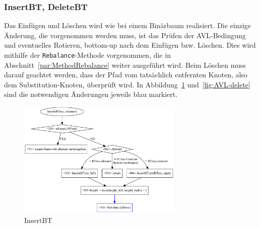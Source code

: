 \subsubsection{InsertBT, DeleteBT}
Das Einfügen und Löschen wird wie bei einem Binärbaum realisiert.
Die einzige Änderung, die vorgenommen werden muss, ist das Prüfen der
AVL-Bedingung und eventuelles Rotieren, bottom-up nach dem Einfügen bzw. Löschen.
Dies wird mithilfe der \verb|Rebalance|-Methode vorgenommen, die in
Abschnitt~\ref{par:MethodRebalance} weiter ausgeführt wird.
Beim Löschen muss darauf geachtet werden, dass der Pfad vom tatsächlich entfernten Knoten, also
dem Substitution-Knoten, überprüft wird.
In Abbildung~\ref{fig:AVL-insert} und~\ref{fig:AVL-delete} sind die notwendigen Änderungen jeweils
blau markiert.

\begin{figure}[htbp]
    \centering
    \includegraphics[width= 0.70\textwidth]{img/gv/insert}
    \caption{InsertBT}
    \label{fig:AVL-insert}
\end{figure}
